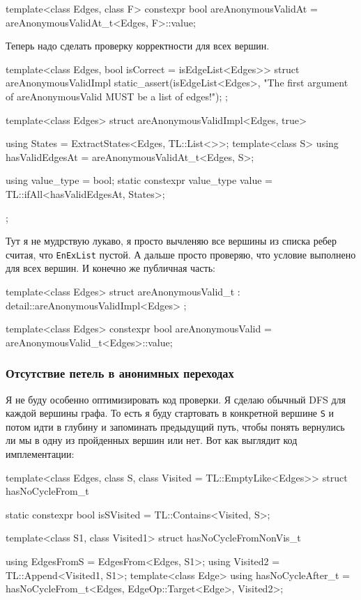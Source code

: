 \documentclass{article}
\begin{document}
{\begin{cppcode}[\nonumbers]
template<class Edges, class F>
constexpr bool areAnonymousValidAt = areAnonymousValidAt_t<Edges, F>::value;
\end{cppcode}
Теперь надо сделать проверку корректности для всех вершин.
\begin{cppcode}[\nonumbers]
template<class Edges, bool isCorrect = isEdgeList<Edges>>
struct areAnonymousValidImpl {
  static_assert(isEdgeList<Edges>,
                "The first argument of areAnonymousValid MUST be a list of edges!");
};

template<class Edges>
struct areAnonymousValidImpl<Edges, true> {
  using States = ExtractStates<Edges, TL::List<>>;
  template<class S>
  using hasValidEdgesAt = areAnonymousValidAt_t<Edges, S>;

  using value_type = bool;
  static constexpr value_type value = TL::ifAll<hasValidEdgesAt, States>;
};
\end{cppcode}
Тут я не мудрствую лукаво, я просто вычленяю все вершины из списка ребер считая, что \verb"EnExList" пустой.
А дальше просто проверяю, что условие выполнено для всех вершин.
И конечно же публичная часть:
\begin{cppcode}[\nonumbers]
template<class Edges>
struct areAnonymousValid_t : detail::areAnonymousValidImpl<Edges> {};

template<class Edges>
constexpr bool areAnonymousValid = areAnonymousValid_t<Edges>::value;
\end{cppcode}

\subsubsection{Отсутствие петель в анонимных переходах}

Я не буду особенно оптимизировать код проверки.
Я сделаю обычный DFS для каждой вершины графа.
То есть я буду стартовать в конкретной вершине \verb"S" и потом идти в глубину и запоминать предыдущий путь, чтобы понять вернулись ли мы в одну из пройденных вершин или нет.
Вот как выглядит код имплементации:
\begin{cppcode}[\nonumbers]
template<class Edges, class S, class Visited = TL::EmptyLike<Edges>>
struct hasNoCycleFrom_t {
  static constexpr bool isSVisited = TL::Contains<Visited, S>;

  template<class S1, class Visited1>
  struct hasNoCycleFromNonVis_t {
    using EdgesFromS = EdgesFrom<Edges, S1>;
    using Visited2 = TL::Append<Visited1, S1>;
    template<class Edge>
    using hasNoCycleAfter_t = hasNoCycleFrom_t<Edges, EdgeOp::Target<Edge>, Visited2>;
    
}}
\end{cppcode}}
\end{document}
